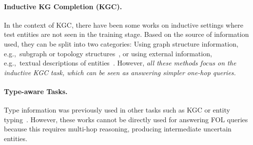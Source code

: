 \paragraph{Inductive KG Completion (KGC).} In the context of KGC, there have been some works on inductive settings where test entities are not seen in the training stage. Based on the source of information used, they can be split into two categories: Using  graph structure information,  e.g.,\ subgraph or topology structures~\cite{teru2020inductive,Jiajuninductive,wang2021relational}, or  using  external information, e.g.,\ textual descriptions of entities~\cite{daza2021inductive}. However, \textit{all these methods  focus on the inductive KGC task, which can be seen as answering simpler one-hop queries.}


\paragraph{Type-aware Tasks.} Type information was previously used in other tasks such as KGC or entity typing~\cite{yao2019kg,zhao2020connecting,daza2021inductive,niu2020autoeter,pan2021context}.
However, these works cannot be directly used for answering FOL queries because this  requires multi-hop reasoning, producing intermediate uncertain entities.
